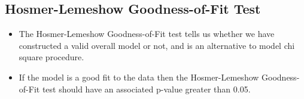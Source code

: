 \documentclass[a4paper,12pt]{article}
\begin{document}




\subsection{Hosmer-Lemeshow Goodness-of-Fit Test}
\begin{framed}
	\begin{itemize}
		\item The Hosmer-Lemeshow Goodness-of-Fit
		test tells us whether we have constructed a valid overall model or not, and is an alternative to model chi square procedure.
		\item If the model is a good fit to the data then the Hosmer-Lemeshow Goodness-of-Fit test should have an associated p-value greater than 0.05.
	\end{itemize} 
\end{framed}

\end{document}

